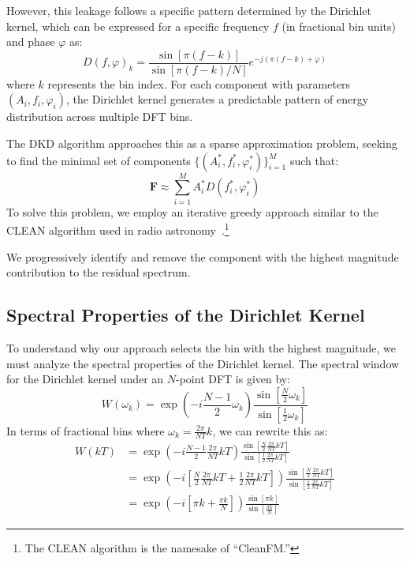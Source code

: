 \documentclass[11pt,twoside]{report}
\newcommand{\w}{\omega}
\numberwithin{thm}{section}
\numberwithin{equation}{section}
\begin{document}
However, this leakage follows a specific pattern determined by the Dirichlet kernel, which can be expressed for a specific frequency $f$ (in fractional bin units) and phase $\varphi$ as:
\begin{equation}
\label{eq:dirichlet_kernel}
D(f, \varphi)_k = \frac{\sin[\pi (f - k)]}{\sin[\pi (f - k)/N]} e^{-j(\pi (f - k) + \varphi)}
\end{equation}
where $k$ represents the bin index. For each component with parameters $(A_i, f_i, \varphi_i)$, the Dirichlet kernel generates a predictable pattern of energy distribution across multiple DFT bins.

The DKD algorithm approaches this as a sparse approximation problem, seeking to find the minimal set of components $\{(A_i^*, f_i^*, \varphi_i^*)\}_{i=1}^M$ such that:
\begin{equation}
\label{eq:sparse_approximation}
\mathbf{F} \approx \sum_{i=1}^{M} A_i^* D(f_i^*, \varphi_i^*)
\end{equation}
To solve this problem, we employ an iterative greedy approach similar to the CLEAN algorithm used in radio astronomy~\cite{Cornwell_2009}.\footnote{The CLEAN algorithm is the namesake of ``CleanFM.''}

We progressively identify and remove the component with the highest magnitude contribution to the residual spectrum.

\subsection{Spectral Properties of the Dirichlet Kernel}

To understand why our approach selects the bin with the highest magnitude, we must analyze the spectral properties of the Dirichlet kernel. The spectral window for the Dirichlet kernel under an $N$-point DFT is given by:
\begin{equation}
\label{eq:dirichlet_window}
W(\w_k) = \exp\left(-i\frac{N-1}{2}\w_k\right)\frac{\sin\left[\frac{N}{2}\w_k\right]}{\sin\left[\frac{1}{2}\w_k\right]}
\end{equation}
In terms of fractional bins where $\w_k = \frac{2\pi}{NT}k$, we can rewrite this as:
\begin{align}
\label{eq:dirichlet_window_fractional}
W(kT) &= \exp\left(-i\frac{N-1}{2}\frac{2\pi}{NT}kT\right)\frac{\sin\left[\frac{N}{2}\frac{2\pi}{NT}kT\right]}{\sin\left[\frac{1}{2}\frac{2\pi}{NT}kT\right]}\\
&= \exp\left(-i\left[\frac{N}{2}\frac{2\pi}{NT}kT + \frac{1}{2}\frac{2\pi}{NT}kT\right]\right)\frac{\sin\left[\frac{N}{2}\frac{2\pi}{NT}kT\right]}{\sin\left[\frac{1}{2}\frac{2\pi}{NT}kT\right]} \\
&= \exp\left(-i\left[\pi k + \frac{\pi k}{N}\right]\right)\frac{\sin\left[\pi k\right]}{\sin\left[\frac{\pi k}{N}\right]}
\end{align}
\end{document}
